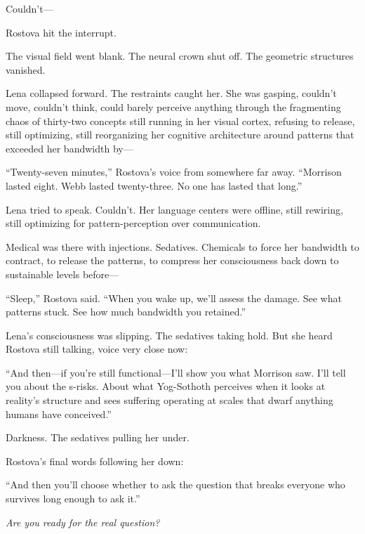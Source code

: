Couldn't—

Rostova hit the interrupt.

The visual field went blank. The neural crown shut off. The geometric structures vanished.

Lena collapsed forward. The restraints caught her. She was gasping, couldn't move, couldn't think, could barely perceive anything through the fragmenting chaos of thirty-two concepts still running in her visual cortex, refusing to release, still optimizing, still reorganizing her cognitive architecture around patterns that exceeded her bandwidth by—

``Twenty-seven minutes,'' Rostova's voice from somewhere far away. ``Morrison lasted eight. Webb lasted twenty-three. No one has lasted that long.''

Lena tried to speak. Couldn't. Her language centers were offline, still rewiring, still optimizing for pattern-perception over communication.

Medical was there with injections. Sedatives. Chemicals to force her bandwidth to contract, to release the patterns, to compress her consciousness back down to sustainable levels before—

``Sleep,'' Rostova said. ``When you wake up, we'll assess the damage. See what patterns stuck. See how much bandwidth you retained.''

Lena's consciousness was slipping. The sedatives taking hold. But she heard Rostova still talking, voice very close now:

``And then—if you're still functional—I'll show you what Morrison saw. I'll tell you about the s-risks. About what Yog-Sothoth perceives when it looks at reality's structure and sees suffering operating at scales that dwarf anything humans have conceived.''

Darkness. The sedatives pulling her under.

Rostova's final words following her down:

``And then you'll choose whether to ask the question that breaks everyone who survives long enough to ask it.''

\textit{Are you ready for the real question?}
